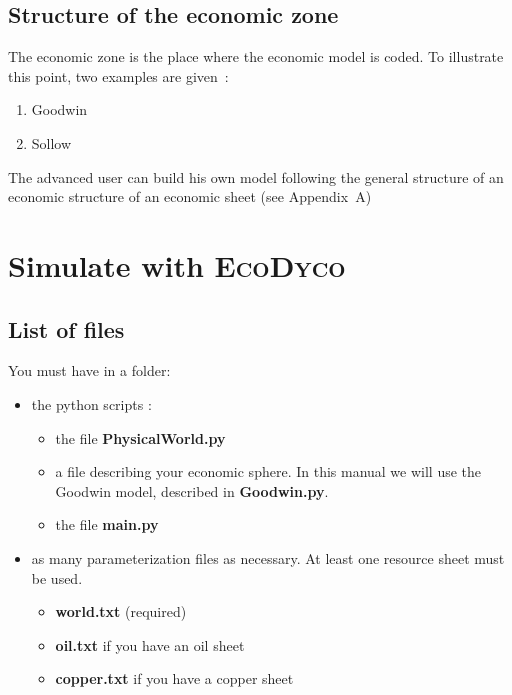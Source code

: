 \documentclass[12pt,a4paper]{article}%
\newcommand{\ed}{\textsc{EcoDyco}}
\begin{document}
\subsection{Structure of the economic zone}

The economic zone is the place where the economic model is coded. To illustrate this point, two examples are given~:

\begin{enumerate}
\item Goodwin

\item Sollow
\end{enumerate}

The advanced user can build his own model following the general structure of an economic structure of an economic sheet (see Appendix~A)







\section{Simulate with \ed}

\subsection{List of files}

You must have in a folder:

\begin{itemize}
	\item the python scripts :
	
	\begin{itemize}
		\item the file \textbf{PhysicalWorld.py}
		
		\item a file describing your economic sphere. In this manual we will use the Goodwin model, described in \textbf{Goodwin.py}.
		
		\item the file \textbf{main.py}
	\end{itemize}
\end{itemize}

\begin{itemize}
	\item as many parameterization files as necessary. At least one resource sheet must be used.
	
	\begin{itemize}
		\item \textbf{world.txt} (required)
		
		\item \textbf{oil.txt} if you have an oil sheet
		
		\item \textbf{copper.txt} if you have a copper sheet
		
	\end{itemize}
\end{itemize}
\end{document}
